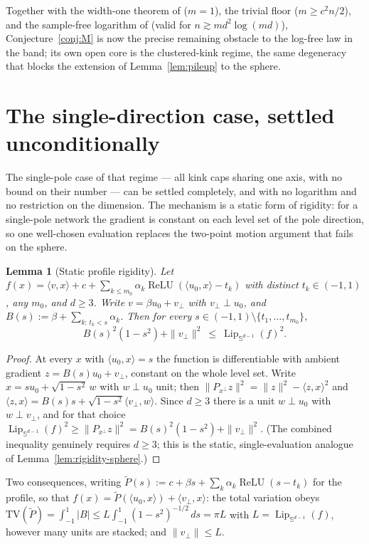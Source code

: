 \documentclass[11pt,reqno]{amsart}
\theoremstyle{plain}
\newtheorem{lemma}[theorem]{Lemma}
\theoremstyle{definition}
\theoremstyle{remark}
\newcommand{\Sd}{\mathbb{S}^{d-1}}
\newcommand{\Lip}{\operatorname{Lip}}
\newcommand{\relu}{\operatorname{ReLU}}
\newcommand{\inn}[2]{\langle #1,#2\rangle}
\begin{document}
Together with the width-one theorem of \cite{paper} ($m=1$), the trivial floor ($m\ge c^2n/2$), and the sample-free logarithm of \cite{paper} (valid for $n\gtrsim md^2\log(md)$), Conjecture~\ref{conj:M} is now the precise remaining obstacle to the log-free law in the band; its own open core is the clustered-kink regime, the same degeneracy that blocks the extension of Lemma~\ref{lem:pileup} to the sphere.

\section{The single-direction case, settled unconditionally}

The single-pole case of that regime --- all kink caps sharing one axis, with no bound on their number --- can be settled completely, and with no logarithm and no restriction on the dimension. The mechanism is a static form of rigidity: for a single-pole network the gradient is constant on each level set of the pole direction, so one well-chosen evaluation replaces the two-point motion argument that fails on the sphere.

\begin{lemma}[Static profile rigidity]\label{lem:staticrig}
Let $f(x)=\inn vx+c+\sum_{k\le m_0}\alpha_k\relu(\inn{u_0}x-t_k)$ with distinct $t_k\in(-1,1)$, any $m_0$, and $d\ge3$. Write $v=\beta u_0+v_\perp$ with $v_\perp\perp u_0$, and $B(s):=\beta+\sum_{k:\,t_k<s}\alpha_k$. Then for every $s\in(-1,1)\setminus\{t_1,\dots,t_{m_0}\}$,
\[
B(s)^2(1-s^2)+\|v_\perp\|^2\ \le\ \Lip_{\Sd}(f)^2 .
\]
\end{lemma}
\begin{proof}[Proof]
At every $x$ with $\inn{u_0}x=s$ the function is differentiable with ambient gradient $z=B(s)u_0+v_\perp$, constant on the whole level set. Write $x=su_0+\sqrt{1-s^2}\,w$ with $w\perp u_0$ unit; then $\|P_{x^\perp}z\|^2=\|z\|^2-\inn zx^2$ and $\inn zx=B(s)s+\sqrt{1-s^2}\inn{v_\perp}w$. Since $d\ge3$ there is a unit $w\perp u_0$ with $w\perp v_\perp$, and for that choice $\Lip_{\Sd}(f)^2\ge\|P_{x^\perp}z\|^2=B(s)^2(1-s^2)+\|v_\perp\|^2$. (The combined inequality genuinely requires $d\ge3$; this is the static, single-evaluation analogue of Lemma~\ref{lem:rigidity-sphere}.)
\end{proof}

Two consequences, writing $\tilde P(s):=c+\beta s+\sum_k\alpha_k\relu(s-t_k)$ for the profile, so that $f(x)=\tilde P(\inn{u_0}x)+\inn{v_\perp}x$: the total variation obeys $\mathrm{TV}(\tilde P)=\int_{-1}^1|B|\le L\int_{-1}^1(1-s^2)^{-1/2}\,ds=\pi L$ with $L=\Lip_{\Sd}(f)$, however many units are stacked; and $\|v_\perp\|\le L$.
\end{document}
